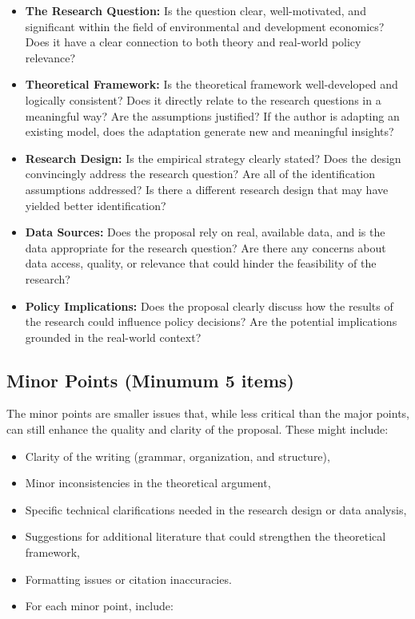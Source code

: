 \documentclass[
]{article}
\providecommand{\tightlist}{%
  \setlength{\itemsep}{0pt}\setlength{\parskip}{0pt}}
\begin{document}
\begin{itemize}
\item
  \textbf{The Research Question:} Is the question clear, well-motivated, and significant within the field of environmental and development economics? Does it have a clear connection to both theory and real-world policy relevance?
\item
  \textbf{Theoretical Framework:} Is the theoretical framework well-developed and logically consistent? Does it directly relate to the research questions in a meaningful way? Are the assumptions justified? If the author is adapting an existing model, does the adaptation generate new and meaningful insights?
\item
  \textbf{Research Design:} Is the empirical strategy clearly stated? Does the design convincingly address the research question? Are all of the identification assumptions addressed? Is there a different research design that may have yielded better identification?
\item
  \textbf{Data Sources:} Does the proposal rely on real, available data, and is the data appropriate for the research question? Are there any concerns about data access, quality, or relevance that could hinder the feasibility of the research?
\item
  \textbf{Policy Implications:} Does the proposal clearly discuss how the results of the research could influence policy decisions? Are the potential implications grounded in the real-world context?
\end{itemize}

\hypertarget{minor-points-minumum-5-items}{%
\subsection{Minor Points (Minumum 5 items)}\label{minor-points-minumum-5-items}}

The minor points are smaller issues that, while less critical than the major points, can still enhance the quality and clarity of the proposal. These might include:

\begin{itemize}
\tightlist
\item
  Clarity of the writing (grammar, organization, and structure),
\item
  Minor inconsistencies in the theoretical argument,
\item
  Specific technical clarifications needed in the research design or data analysis,
\item
  Suggestions for additional literature that could strengthen the theoretical framework,
\item
  Formatting issues or citation inaccuracies.
\item
  For each minor point, include:
\end{itemize}
\end{document}
